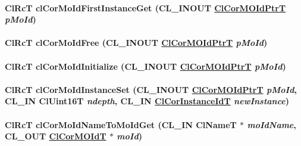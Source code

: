\hypertarget{group__group13_ga118}{
\paragraph[clCorMoIdFirstInstanceGet]{\setlength{\rightskip}{0pt plus 5cm}Cl\-Rc\-T cl\-Cor\-Mo\-Id\-First\-Instance\-Get (CL\_\-INOUT \hyperlink{struct_cl_cor_m_o_id}{Cl\-Cor\-MOId\-Ptr\-T} {\em p\-Mo\-Id})}\hfill}
\label{group__group13_ga118}


\hypertarget{group__group13_ga109}{
\paragraph[clCorMoIdFree]{\setlength{\rightskip}{0pt plus 5cm}Cl\-Rc\-T cl\-Cor\-Mo\-Id\-Free (CL\_\-INOUT \hyperlink{struct_cl_cor_m_o_id}{Cl\-Cor\-MOId\-Ptr\-T} {\em p\-Mo\-Id})}\hfill}
\label{group__group13_ga109}


\hypertarget{group__group13_ga107}{
\paragraph[clCorMoIdInitialize]{\setlength{\rightskip}{0pt plus 5cm}Cl\-Rc\-T cl\-Cor\-Mo\-Id\-Initialize (CL\_\-INOUT \hyperlink{struct_cl_cor_m_o_id}{Cl\-Cor\-MOId\-Ptr\-T} {\em p\-Mo\-Id})}\hfill}
\label{group__group13_ga107}


\hypertarget{group__group13_ga128}{
\paragraph[clCorMoIdInstanceSet]{\setlength{\rightskip}{0pt plus 5cm}Cl\-Rc\-T cl\-Cor\-Mo\-Id\-Instance\-Set (CL\_\-INOUT \hyperlink{struct_cl_cor_m_o_id}{Cl\-Cor\-MOId\-Ptr\-T} {\em p\-Mo\-Id}, CL\_\-IN Cl\-Uint16T {\em ndepth}, CL\_\-IN \hyperlink{group__group13_ga4}{Cl\-Cor\-Instance\-Id\-T} {\em new\-Instance})}\hfill}
\label{group__group13_ga128}


\hypertarget{group__group13_ga116}{
\paragraph[clCorMoIdNameToMoIdGet]{\setlength{\rightskip}{0pt plus 5cm}Cl\-Rc\-T cl\-Cor\-Mo\-Id\-Name\-To\-Mo\-Id\-Get (CL\_\-IN Cl\-Name\-T $\ast$ {\em mo\-Id\-Name}, CL\_\-OUT \hyperlink{struct_cl_cor_m_o_id}{Cl\-Cor\-MOId\-T} $\ast$ {\em mo\-Id})}\hfill}
\label{group__group13_ga116}


